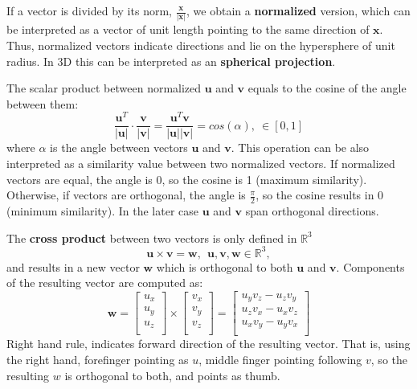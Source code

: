 If a vector is divided by its norm, $\frac{\mathbf{x}}{ \vert \mathbf{x} \vert }$, we obtain a \textbf{normalized} version, which can be interpreted as a vector of unit length pointing to the same direction of $\mathbf{x}$. Thus, normalized vectors indicate directions and lie on the hypersphere of unit radius. In 3D this can be interpreted as an \textbf{spherical projection}.

The scalar product between normalized $\mathbf{u}$ and $\mathbf{v}$ equals to the cosine of the angle between them:
\begin{equation}
 \frac{\mathbf{u}^T}{\vert \mathbf{u} \vert} \cdot \frac{\mathbf{v}}{\vert \mathbf{v} \vert} = 
 \frac{\mathbf{u}^T\mathbf{v}}{\vert \mathbf{u} \vert \vert \mathbf{v} \vert} =
 cos (\alpha) , \ \in [0,1]
\end{equation}
where $\alpha$ is the angle between vectors $\mathbf{u}$ and $\mathbf{v}$. This operation can be also interpreted as a similarity value between two normalized vectors. If normalized vectors are equal, the angle is 0, so the cosine is 1 (maximum similarity). Otherwise, if vectors are orthogonal, the angle is $\frac{\pi}{2}$, so the cosine results in 0 (minimum similarity). In the later case $\mathbf{u}$ and $\mathbf{v}$ span orthogonal directions. 

The \textbf{cross product} between two vectors is only defined in $\mathbb{R}^3$
\begin{equation}
 \mathbf{u} \times \mathbf{v} = \mathbf{w} , \ \ \mathbf{u},\mathbf{v},\mathbf{w} \in \mathbb{R}^3, 
\end{equation}
and results in a new vector $\mathbf{w}$ which is orthogonal to both $\mathbf{u}$ and $\mathbf{v}$. Components of the resulting vector are computed as: 
\begin{equation}
\mathbf{w} = 
\left[
\begin{array}{ccc}
  u_x\\
  u_y\\
  u_z\\
\end{array}
\right]
\times
\left[
\begin{array}{ccc}
  v_x\\
  v_y\\
  v_z\\
\end{array}
\right]
 = 
\left[
\begin{array}{ccc}
  u_y v_z - u_z v_y\\
  u_z v_x - u_x v_z\\
  u_x v_y - u_y v_x\\
\end{array}
\right]
 \end{equation}
Right hand rule, indicates forward direction of the resulting vector. That is, using the right hand, forefinger pointing as $u$, middle finger pointing following $v$, so the resulting $w$ is orthogonal to both, and points as thumb. 

